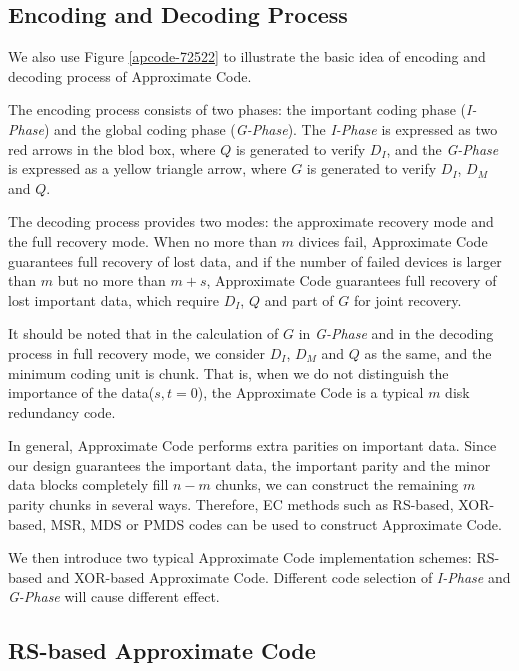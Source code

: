 \documentclass[sigconf]{acmart}
\begin{document}
\subsection{Encoding and Decoding Process}
We also use Figure \ref{apcode-72522} to illustrate the basic idea of encoding and decoding process of Approximate Code.

The encoding process consists of two phases: the important coding phase (\emph{I-Phase}) and the global coding phase (\emph{G-Phase}). 
The \emph{I-Phase} is expressed as two red arrows in the blod box, where $Q$ is generated to verify $D_I$, and the \emph{G-Phase} is expressed as a yellow triangle arrow, where $G$ is generated to verify $D_I$, $D_M$ and $Q$.

The decoding process provides two modes: the approximate recovery mode and the full recovery mode.
When no more than $m$ divices fail, Approximate Code guarantees full recovery of lost data, and if the number of failed devices is larger than $m$ but no more than $m+s$, Approximate Code guarantees full recovery of lost important data, which require $D_I$, $Q$ and part of $G$ for joint recovery.

It should be noted that in the calculation of $G$ in \emph{G-Phase} and in the decoding process in full recovery mode, we consider $D_I$, $D_M$ and $Q$ as the same, and the minimum coding unit is chunk. That is, when we do not distinguish the importance of the data($s,t = 0$), the Approximate Code is a typical $m$ disk redundancy code.

In general, Approximate Code performs extra parities on important data.
Since our design guarantees the important data, the important parity and the minor data blocks completely fill $n-m$ chunks, we can construct the remaining $m$ parity chunks in several ways. Therefore, EC methods such as RS-based, XOR-based, MSR, MDS or PMDS codes can be used to construct Approximate Code. 

We then introduce two typical Approximate Code implementation schemes: RS-based and XOR-based Approximate Code. Different code selection of \emph{I-Phase} and \emph{G-Phase} will cause different effect.

\subsection{RS-based Approximate Code}
\end{document}

